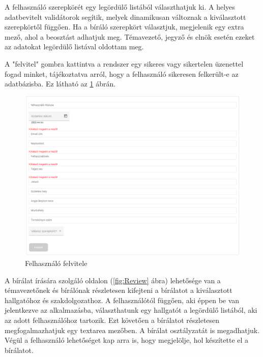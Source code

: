 A felhasználó szerepkörét egy legördülő listából választhatjuk ki. A helyes adatbevitelt validátorok segítik, melyek dinamikusan változnak a kiválasztott szerepkörtől függően. Ha a bíráló szerepkört választjuk, megjelenik egy extra mező, ahol a beosztást adhatjuk meg. Témavezető, jegyző és elnök esetén ezeket az adatokat legördülő listával oldottam meg.

A "felvitel" gombra kattintva a rendszer egy sikeres vagy sikertelen üzenettel fogad minket, tájékoztatva arról, hogy a felhasználó sikeresen felkerült-e az adatbázisba. Ez látható az \ref{fig:addUsers} ábrán.

\begin{figure}[h]
\centering
\includegraphics[width=\textwidth]{images/addUsers.png}
\caption{Felhasználó felvitele}
\label{fig:addUsers}
\end{figure}

\newpage


A bírálat írására szolgáló oldalon (\ref{fig:Review} ábra) lehetősége van a témavezetőnek és bírálónak részletesen kifejteni a bírálatot a kiválasztott hallgatóhoz és szakdolgozathoz. A felhasználótól függően, aki éppen be van jelentkezve az alkalmazásba, választhatunk egy hallgatót a legördülő listából, aki az adott felhasználóhoz tartozik. Ezt követően a bírálatot részletesen megfogalmazhatjuk egy textarea mezőben. A bírálat osztályzatát is megadhatjuk. Végül a felhasználó lehetőséget kap arra is, hogy megjelölje, hol készítette el a bírálatot.


